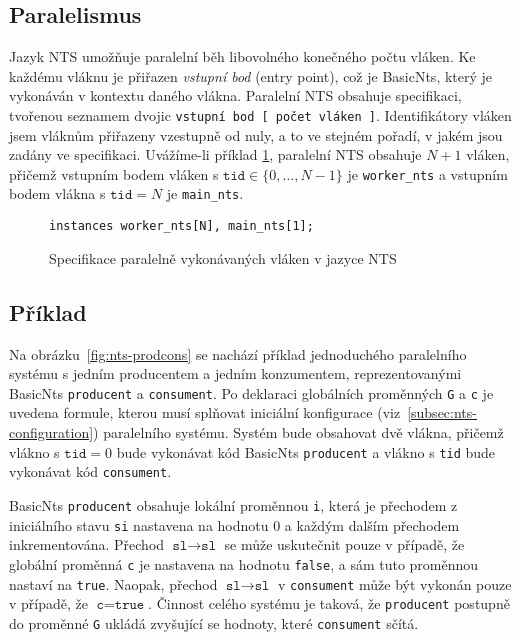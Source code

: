 \documentclass[12pt]{fithesis2}
\begin{document}
\subsection{Paralelismus}
\label{subsec:nts-paralelism}
Jazyk NTS umožňuje paralelní běh libovolného konečného počtu vláken. Ke každému vláknu je přiřazen \textit{vstupní bod} (entry point), což je BasicNts, který je vykonáván v kontextu daného vlákna. Paralelní NTS obsahuje specifikaci, tvořenou seznamem dvojic \texttt{vstupní bod [ počet vláken ]}. Identifikátory vláken jsem vláknům přiřazeny vzestupně od nuly, a to ve stejném pořadí, v jakém jsou zadány ve specifikaci.  Uvážíme-li příklad \ref{fig:nts-instances}, paralelní NTS obsahuje $N+1$ vláken, přičemž vstupním bodem vláken s $\texttt{tid} \in \{ 0, \ldots, N - 1 \}$ je \texttt{worker_nts} a vstupním bodem vlákna s $\texttt{tid} = N$ je \texttt{main_nts}.

\begin{figure}[h!]
\begin{lstlisting}
instances worker_nts[N], main_nts[1];
\end{lstlisting}
\caption{Specifikace paralelně vykonávaných vláken v jazyce NTS}
\label{fig:nts-instances}
\end{figure}



\subsection{Příklad}
Na obrázku~\ref{fig:nts-prodcons} se nachází příklad jednoduchého paralelního systému s jedním producentem a jedním konzumentem, reprezentovanými BasicNts \texttt{producent} a \texttt{consument}. Po deklaraci globálních proměnných \texttt{G} a \texttt{c} je uvedena formule, kterou musí splňovat iniciální konfigurace  (viz~\ref{subsec:nts-configuration}) paralelního systému. Systém bude obsahovat dvě vlákna, přičemž vlákno s $\texttt{tid} = 0$ bude vykonávat kód BasicNts \texttt{producent} a vlákno s \texttt{tid} bude vykonávat kód \texttt{consument}.

BasicNts \texttt{producent} obsahuje lokální proměnnou \texttt{i}, která je přechodem z iniciálního stavu \texttt{si} nastavena na hodnotu $0$ a každým dalším přechodem inkrementována. Přechod $\texttt{sl} \rightarrow \texttt{sl}$ se může uskutečnit pouze v případě, že globální proměnná \texttt{c} je nastavena na  hodnotu \texttt{false}, a sám tuto proměnnou nastaví na \texttt{true}. Naopak, přechod $\texttt{sl} \rightarrow \texttt{sl}$ v \texttt{consument} může být vykonán pouze v případě, že $\texttt{c} = \texttt{true}$. Činnost celého systému je taková, že \texttt{producent} postupně do proměnné \texttt{G} ukládá zvyšující se hodnoty, které \texttt{consument} sčítá.
\end{document}
